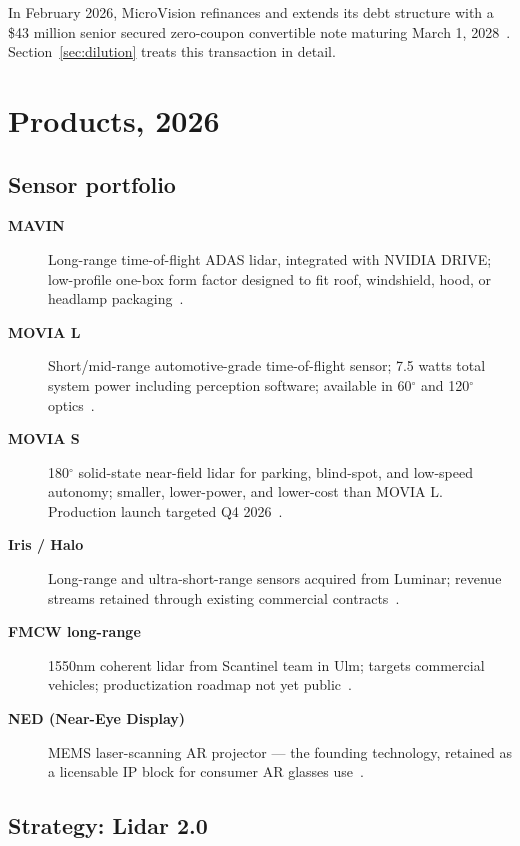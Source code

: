 \documentclass[10pt,letterpaper,twocolumn]{article}
\begin{document}
In February 2026, MicroVision refinances and extends its debt structure with a \$43 million senior secured zero-coupon convertible note maturing March 1, 2028~\citep{mvis2026notes,investing2026notes,tradingview2026notes}. Section~\ref{sec:dilution} treats this transaction in detail.

\section{Products, 2026}

\subsection{Sensor portfolio}

\begin{description}
  \item[\textbf{MAVIN}] Long-range time-of-flight ADAS lidar, integrated with NVIDIA DRIVE; low-profile one-box form factor designed to fit roof, windshield, hood, or headlamp packaging~\citep{microvision2026mavin}.
  \item[\textbf{MOVIA L}] Short/mid-range automotive-grade time-of-flight sensor; 7.5 watts total system power including perception software; available in 60\(^\circ\) and 120\(^\circ\) optics~\citep{microvision2026movial}.
  \item[\textbf{MOVIA S}] 180\(^\circ\) solid-state near-field lidar for parking, blind-spot, and low-speed autonomy; smaller, lower-power, and lower-cost than MOVIA L. Production launch targeted Q4 2026~\citep{microvision2026movias}.
  \item[\textbf{Iris / Halo}] Long-range and ultra-short-range sensors acquired from Luminar; revenue streams retained through existing commercial contracts~\citep{mvis2026luminar}.
  \item[\textbf{FMCW long-range}] 1550nm coherent lidar from Scantinel team in Ulm; targets commercial vehicles; productization roadmap not yet public~\citep{mvis2025scantinel}.
  \item[\textbf{NED (Near-Eye Display)}] MEMS laser-scanning AR projector --- the founding technology, retained as a licensable IP block for consumer AR glasses use~\citep{scudder2026grok}.
\end{description}

\subsection{Strategy: Lidar 2.0}
\end{document}
